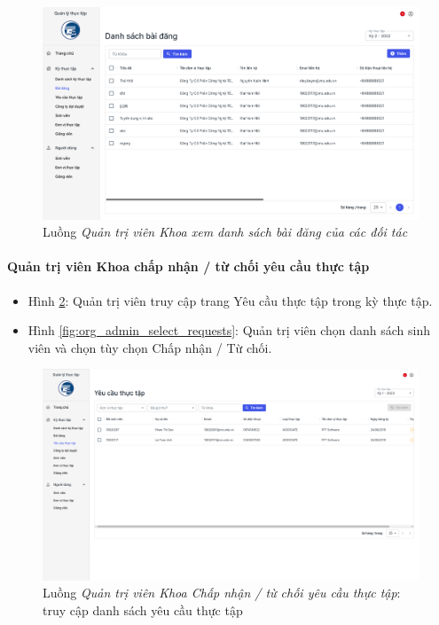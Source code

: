 \documentclass[./../main.tex]{subfiles}
\begin{document}
\begin{figure}[]
	\includegraphics[width=\linewidth]{./images/image71.png}
	\caption{Luồng \emph{Quản trị viên Khoa xem danh sách bài đăng của các đối tác}}
	\label{fig:orgadmin_list_posts}
\end{figure}

\paragraph*{Quản trị viên Khoa chấp nhận / từ chối yêu cầu thực tập}

\begin{itemize}
	\item Hình \ref{fig:org_admin_access_list_requests}: Quản trị viên truy cập trang Yêu cầu thực tập trong kỳ thực tập.
	\item Hình \ref{fig:org_admin_select_requests}: Quản trị viên chọn danh sách sinh viên và chọn tùy chọn Chấp nhận / Từ chối.
\end{itemize}

\begin{figure}[]
	\includegraphics[width=\linewidth]{./images/image72.png}
	\caption{Luồng \emph{Quản trị viên Khoa Chấp nhận / từ chối yêu cầu thực tập}: truy cập danh sách yêu cầu thực tập}
	\label{fig:org_admin_access_list_requests}
\end{figure}
\end{document}
